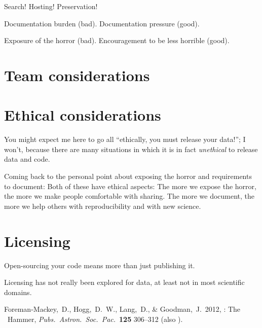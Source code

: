 \documentclass[12pt,twoside,pdftex]{article}
\newcommand{\MCMC}{\acronym{MCMC}}
\begin{document}
Search! Hosting! Preservation!

Documentation burden (bad). Documentation pressure (good).

Exposure of the horror (bad). Encouragement to be less horrible (good).

\section{Team considerations}

\section{Ethical considerations}

You might expect me here to go all ``ethically, you must release your
data!''; I won't, because there are many situations in which it is in
fact \emph{unethical} to release data and code.

Coming back to the personal point about exposing the horror and
requirements to document: Both of these have ethical aspects: The more
we expose the horror, the more we make people comfortable with
sharing. The more we document, the more we help others with
reproducibility and with new science.

\section{Licensing}

Open-sourcing your code means more than just publishing it.

Licensing has not really been explored for data, at least not in most
scientific domains.

\clearpage
{}\theendnotes

\clearpage
\raggedright
\begin{thebibliography}{}
  Foreman-Mackey,~D., Hogg,~D.~W., Lang,~D., \& Goodman,~J.\ 2012,
  : The \MCMC\ Hammer,
  \textit{Pubs.\ Astron.\ Soc.\ Pac.}\ \textbf{125} 306--312
  (also ).
\end{thebibliography}
\end{document}
